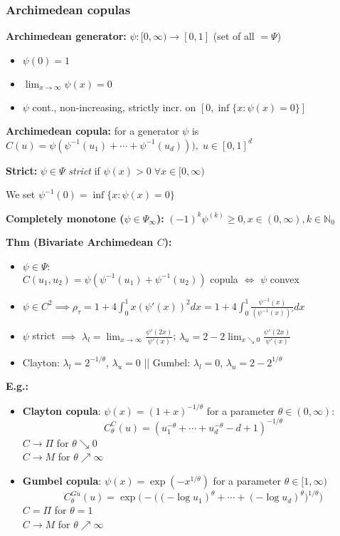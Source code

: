 \subsubsection*{Archimedean copulas}
\textbf{Archimedean generator:} $\psi:[0,\infty)\rightarrow [0,1]$ (set of all $=\Psi$)
\begin{itemize}
    \item $\psi(0)=1$
    \item $\lim_{x\rightarrow \infty}\psi(x)=0$
    \item $\psi$ cont., non-increasing, strictly incr. on $[0, \inf\{x : \psi(x) = 0\}]$
\end{itemize}

\textbf{Archimedean copula:} for a generator $\psi$ is\\ $C(u)=\psi(\psi^{-1}(u_1)+\cdots+\psi^{-1}(u_d))),\; u\in [0,1]^d$ 

\textbf{Strict:} $\psi\in\Psi$ \textit{strict} if $\psi(x)>0\;\forall x\in [0,\infty)$

We set $\psi^{-1}(0)=\inf\{x:\psi(x)=0\}$

\textbf{Completely monotone ($\psi\in\Psi_{\infty}$):} $(-1)^k\psi^{(k)}\geq 0, x\in (0,\infty), k\in\mathbb{N}_0$

\textbf{Thm (Bivariate Archimedean $C$):}\\
\begin{itemize}
    \item $\psi\in\Psi:$\\
    $C(u_1, u_2) = \psi(\psi^{-1}(u_1) + \psi^{-1}(u_2))$ copula $\iff$ $\psi$ convex

    \item $\psi\in C^2 \implies \rho_\tau=1+4\int^1_0x(\psi'(x))^2dx=1+4\int^1_0\frac{\psi^{-1}(x)}{(\psi^{-1}(x))'}dx$

    \item $\psi$ strict $\implies$  $\lambda_l = \lim_{x\rightarrow \infty} \frac{\psi'(2x)}{\psi'(x)}$;
    $\lambda_u = 2 - 2 \lim_{x\searrow 0} \frac{\psi'(2x)}{\psi'(x)}$
    \item Clayton: $\lambda_l = 2^{-1/\theta}$, $\lambda_u=0$ || 
    Gumbel: $\lambda_l = 0$, $\lambda_u=2-2^{1/\theta}$ 
\end{itemize}

\textbf{E.g.:}
\begin{itemize}
    \item \textbf{Clayton copula}: $\psi(x)=(1+x)^{-1/\theta}$ for a parameter $\theta\in(0,\infty)$:
    \[C^C_{\theta}(u)=(u_1^{-\theta}+\cdots+u_d^{-\theta}-d+1)^{-1/\theta} \]
    $C \rightarrow \Pi$ for $\theta\searrow 0$\\
    $C \rightarrow M$ for $\theta\nearrow \infty$
    \item \textbf{Gumbel copula}: $\psi(x)=\exp(-x^{1/\theta})$ for a parameter $\theta\in[1,\infty)$
    \[ C^{Gu}_\theta(u)=\exp\bigg(-\big((-\log u_1)^\theta + \cdots + (-\log u_d)^\theta\big)^{1/\theta} \bigg) \]
    $C = \Pi$ for $\theta=1$\\
    $C \rightarrow M$ for $\theta\nearrow \infty$
\end{itemize}

